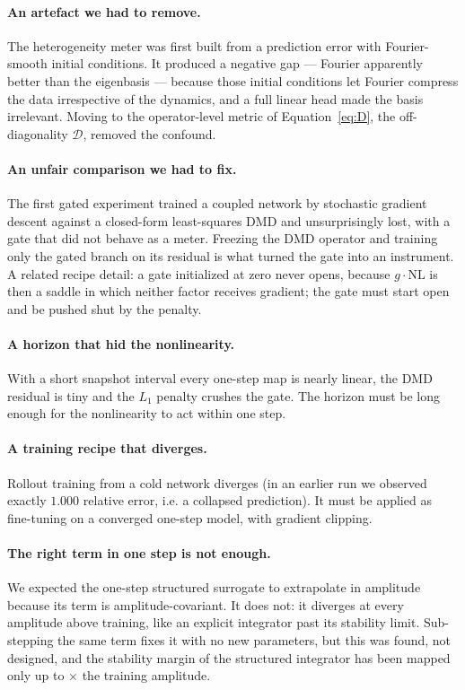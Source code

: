 \documentclass[11pt,a4paper]{article}
\newcommand{\Dm}{\mathcal{D}}
\begin{document}
\paragraph{An artefact we had to remove.} The heterogeneity meter was first built from a prediction error with Fourier-smooth initial conditions. It produced a negative gap — Fourier apparently better than the eigenbasis — because those initial conditions let Fourier compress the data irrespective of the dynamics, and a full linear head made the basis irrelevant. Moving to the operator-level metric of Equation~\eqref{eq:D}, the off-diagonality $\Dm$, removed the confound.

\paragraph{An unfair comparison we had to fix.} The first gated experiment trained a coupled network by stochastic gradient descent against a closed-form least-squares DMD and unsurprisingly lost, with a gate that did not behave as a meter. Freezing the DMD operator and training only the gated branch on its residual is what turned the gate into an instrument. A related recipe detail: a gate initialized at zero never opens, because $g\cdot\mathrm{NL}$ is then a saddle in which neither factor receives gradient; the gate must start open and be pushed shut by the penalty.

\paragraph{A horizon that hid the nonlinearity.} With a short snapshot interval every one-step map is nearly linear, the DMD residual is tiny and the $L_1$ penalty crushes the gate. The horizon must be long enough for the nonlinearity to act within one step.

\paragraph{A training recipe that diverges.} Rollout training from a cold network diverges (in an earlier run we observed exactly $1.000$ relative error, i.e. a collapsed prediction). It must be applied as fine-tuning on a converged one-step model, with gradient clipping.

\paragraph{The right term in one step is not enough.} We expected the one-step structured surrogate to extrapolate in amplitude because its term is amplitude-covariant. It does not: it diverges at every amplitude above training, like an explicit integrator past its stability limit. Sub-stepping the same term fixes it with no new parameters, but this was found, not designed, and the stability margin of the structured integrator has been mapped only up to \wpAmpOod$\times$ the training amplitude.
\end{document}
